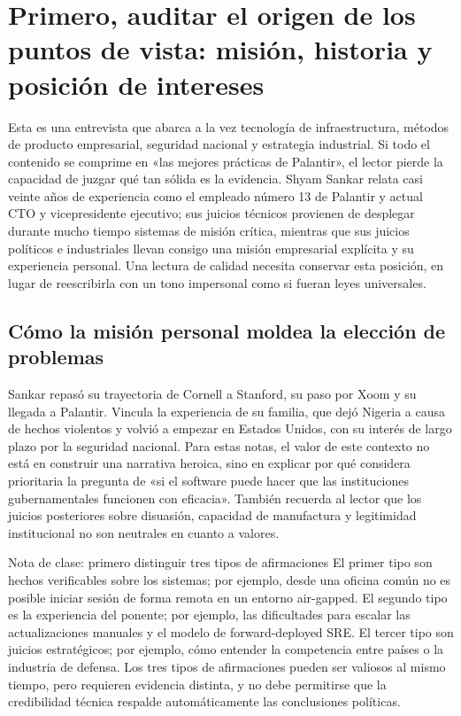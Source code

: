 \section{Primero, auditar el origen de los puntos de vista: misión, historia y posición de intereses}

Esta es una entrevista que abarca a la vez tecnología de infraestructura, métodos de producto empresarial, seguridad nacional y estrategia industrial. Si todo el contenido se comprime en «las mejores prácticas de Palantir», el lector pierde la capacidad de juzgar qué tan sólida es la evidencia. Shyam Sankar relata casi veinte años de experiencia como el empleado número 13 de Palantir y actual CTO y vicepresidente ejecutivo; sus juicios técnicos provienen de desplegar durante mucho tiempo sistemas de misión crítica, mientras que sus juicios políticos e industriales llevan consigo una misión empresarial explícita y su experiencia personal. Una lectura de calidad necesita conservar esta posición, en lugar de reescribirla con un tono impersonal como si fueran leyes universales.

\subsection{Cómo la misión personal moldea la elección de problemas}

Sankar repasó su trayectoria de Cornell a Stanford, su paso por Xoom y su llegada a Palantir. Vincula la experiencia de su familia, que dejó Nigeria a causa de hechos violentos y volvió a empezar en Estados Unidos, con su interés de largo plazo por la seguridad nacional. Para estas notas, el valor de este contexto no está en construir una narrativa heroica, sino en explicar por qué considera prioritaria la pregunta de «si el software puede hacer que las instituciones gubernamentales funcionen con eficacia». También recuerda al lector que los juicios posteriores sobre disuasión, capacidad de manufactura y legitimidad institucional no son neutrales en cuanto a valores.

\begin{knowledgebox}{Nota de clase: primero distinguir tres tipos de afirmaciones}
El primer tipo son hechos verificables sobre los sistemas; por ejemplo, desde una oficina común no es posible iniciar sesión de forma remota en un entorno air-gapped. El segundo tipo es la experiencia del ponente; por ejemplo, las dificultades para escalar las actualizaciones manuales y el modelo de forward-deployed SRE. El tercer tipo son juicios estratégicos; por ejemplo, cómo entender la competencia entre países o la industria de defensa. Los tres tipos de afirmaciones pueden ser valiosos al mismo tiempo, pero requieren evidencia distinta, y no debe permitirse que la credibilidad técnica respalde automáticamente las conclusiones políticas.
\end{knowledgebox}

